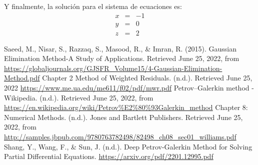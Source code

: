 \documentclass[a4paper,12pt]{article}
\begin{document}
Y finalmente, la solución para el sistema de ecuaciones es:
\begin{alignat*}{4}
    x & {}={} & -1 \\
    y & {}={} & 0 \\
    z & {}={} & 2 
\end{alignat*}
\newpage
\begin{thebibliography}{8}
     Saeed, M., Nisar, S., Razzaq, S., Masood, R., \& Imran, R. (2015). Gaussian Elimination Method-A Study of Applications. Retrieved June 25, 2022, from \url{https://globaljournals.org/GJSFR_Volume15/4-Gaussian-Elimination-Method.pdf}
     Chapter 2 Method of Weighted Residuals. (n.d.). Retrieved June 25, 2022 \url{https://www.me.ua.edu/me611/f02/pdf/mwr.pdf}
     Petrov–Galerkin method - Wikipedia. (n.d.). Retrieved June 25, 2022, from \url{https://en.wikipedia.org/wiki/Petrov%E2%80%93Galerkin_method}
     Chapter 8: Numerical Methods. (n.d.). Jones and Bartlett Publishers. Retrieved June 25, 2022, from \url{http://samples.jbpub.com/9780763782498/82498_ch08_sec01_williams.pdf}
     Shang, Y., Wang, F., \& Sun, J. (n.d.). Deep Petrov-Galerkin Method for Solving Partial Differential Equations. \url{https://arxiv.org/pdf/2201.12995.pdf}
\end{thebibliography}
\end{document}
